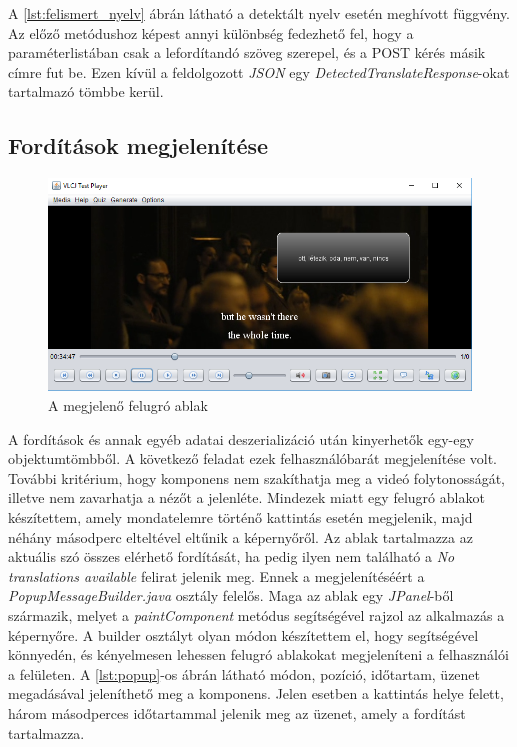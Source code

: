 A \ref{lst:felismert_nyelv} ábrán látható a detektált nyelv esetén meghívott függvény. Az előző metódushoz képest annyi különbség fedezhető fel, hogy a paraméterlistában csak a lefordítandó szöveg szerepel, és a POST kérés másik címre fut be. Ezen kívül a feldolgozott \textit{JSON} egy \textit{DetectedTranslateResponse}-okat tartalmazó tömbbe kerül. 

\subsection{Fordítások megjelenítése}
\begin{figure}
  \includegraphics[width=\linewidth]{images/popup.png}
  \caption{A megjelenő felugró ablak}
  \label{fig:popup}
\end{figure}

A fordítások és annak egyéb adatai deszerializáció után kinyerhetők egy-egy objektumtömbből. A következő feladat ezek felhasználóbarát megjelenítése volt. További kritérium, hogy komponens nem szakíthatja meg a videó folytonosságát, illetve nem zavarhatja a nézőt a jelenléte. Mindezek miatt egy felugró ablakot készítettem, amely mondatelemre történő kattintás esetén megjelenik, majd néhány másodperc elteltével eltűnik a képernyőről. Az ablak tartalmazza az aktuális szó összes elérhető fordítását, ha pedig ilyen nem található a \textit{No translations available} felirat jelenik meg. Ennek a megjelenítéséért a \textit{PopupMessageBuilder.java} osztály felelős. Maga az ablak egy \textit{JPanel}-ből származik, melyet a \textit{paintComponent} metódus segítségével rajzol az alkalmazás a képernyőre. A builder osztályt olyan módon készítettem el, hogy segítségével könnyedén, és kényelmesen lehessen felugró ablakokat megjeleníteni a felhasználói a felületen. A \ref{lst:popup}-os ábrán látható módon, pozíció, időtartam, üzenet megadásával jeleníthető meg a komponens. Jelen esetben a kattintás helye felett, három másodperces időtartammal jelenik meg az üzenet, amely a fordítást tartalmazza.

